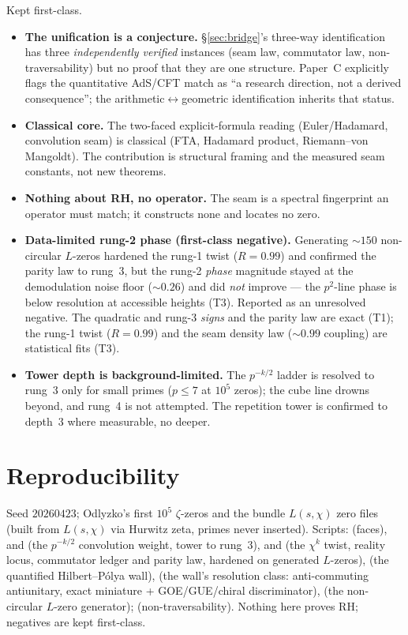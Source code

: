\documentclass[11pt]{article}
\theoremstyle{definition}
\theoremstyle{plain}
\begin{document}
Kept first-class.
\begin{itemize}[nosep]
  \item \textbf{The unification is a conjecture.} \S\ref{sec:bridge}'s three-way identification
        has three \emph{independently verified} instances (seam law, commutator law,
        non-traversability) but no proof that they are one structure. Paper~C explicitly flags the
        quantitative AdS/CFT match as ``a research direction, not a derived consequence''; the
        arithmetic$\leftrightarrow$geometric identification inherits that status.
  \item \textbf{Classical core.} The two-faced explicit-formula reading (Euler/Hadamard,
        convolution seam) is classical (FTA, Hadamard product, Riemann--von Mangoldt). The
        contribution is structural framing and the measured seam constants, not new theorems.
  \item \textbf{Nothing about RH, no operator.} The seam is a spectral fingerprint an operator
        must match; it constructs none and locates no zero.
  \item \textbf{Data-limited rung-2 phase (first-class negative).} Generating $\sim\!150$
        non-circular $L$-zeros hardened the rung-1 twist ($R=0.99$) and confirmed the parity law
        to rung~3, but the rung-2 \emph{phase} magnitude stayed at the demodulation noise floor
        ($\sim\!0.26$) and did \emph{not} improve --- the $p^2$-line phase is below resolution at
        accessible heights (T3). Reported as an unresolved negative. The quadratic and
        rung-3 \emph{signs} and the parity law are exact (T1); the rung-1 twist ($R=0.99$)
        and the seam density law ($\sim\!0.99$ coupling) are statistical fits (T3).
  \item \textbf{Tower depth is background-limited.} The $p^{-k/2}$ ladder is resolved to rung~3
        only for small primes ($p\le 7$ at $10^5$ zeros); the cube line drowns beyond, and rung~4
        is not attempted. The repetition tower is confirmed to depth~3 where measurable, no deeper.
\end{itemize}

\section*{Reproducibility}
Seed $20260423$; Odlyzko's first $10^5$ $\zeta$-zeros and the bundle $L(s,\chi)$ zero files
(built from $L(s,\chi)$ via Hurwitz zeta, primes never inserted). Scripts:
 (faces),
 and  (the $p^{-k/2}$ convolution
weight, tower to rung~3),
 and  (the $\chi^k$ twist,
reality locus, commutator ledger and parity law, hardened on generated $L$-zeros),
 (the quantified Hilbert--P\'olya wall),
 (the wall's resolution class: anti-commuting antiunitary,
exact miniature + GOE/GUE/chiral discriminator),
 (the non-circular $L$-zero generator);
 (non-traversability). Nothing here
proves RH; negatives are kept first-class.
\end{document}
